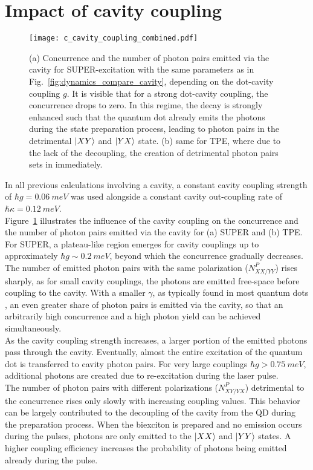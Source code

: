 \documentclass[%
 reprint,superscriptaddress,
 amsmath,amssymb,
 aps]{revtex4-2}
\begin{document}
\section{Impact of cavity coupling}
\begin{figure}
    \centering
    \texttt{[image: c\_cavity\_coupling\_combined.pdf]}
    \caption{(a) Concurrence and the number of photon pairs emitted via the cavity for SUPER-excitation with the same parameters as in Fig.~\ref{fig:dynamics_compare_cavity}, depending on the dot-cavity coupling $g$. It is visible that for a strong dot-cavity coupling, the concurrence drops to zero. In this regime, the decay is strongly enhanced such that the quantum dot already emits the photons during the state preparation process, leading to photon pairs in the detrimental $\ket{XY}$ and $\ket{YX}$ state. (b) same for TPE, where due to the lack of the decoupling, the creation of detrimental photon pairs sets in immediately.}
    \label{fig:cavity_coupling}
\end{figure}
In all previous calculations involving a cavity, a constant cavity coupling strength of $\hbar g = \SI{0.06}{meV}$ was used alongside a constant cavity out-coupling rate of $\hbar\kappa = \SI{0.12}{meV}$.\\ 
Figure~\ref{fig:cavity_coupling} illustrates the influence of the cavity coupling on the concurrence and the number of photon pairs emitted via the cavity for (a) SUPER and (b) TPE. For SUPER, a plateau-like region emerges for cavity couplings up to approximately $\hbar g \sim \SI{0.2}{meV}$, beyond which the concurrence gradually decreases. The number of emitted photon pairs with the same polarization ($N^{P}_{XX/YY}$) rises sharply, as for small cavity couplings, the photons are emitted free-space before coupling to the cavity. With a smaller $\gamma$, as typically found in most quantum dots \cite{schimpf2021quantumdots,hanschke2018quantum}, an even greater share of photon pairs is emitted via the cavity, so that an arbitrarily high concurrence and a high photon yield can be achieved simultaneously.\\
As the cavity coupling strength increases, a larger portion of the emitted photons pass through the cavity. Eventually, almost the entire excitation of the quantum dot is transferred to cavity photon pairs. For very large couplings $\hbar g > \SI{0.75}{meV}$, additional photons are created due to re-excitation during the laser pulse.\\
The number of photon pairs with different polarizations ($N^{P}_{XY/YX}$) detrimental to the concurrence rises only slowly with increasing coupling values. This behavior can be largely contributed to the decoupling of the cavity from the QD during the preparation process. When the biexciton is prepared and no emission occurs during the pulses, photons are only emitted to the $\ket{XX}$ and $\ket{YY}$ states. A higher coupling efficiency increases the probability of photons being emitted already during the pulse.\\
\end{document}
